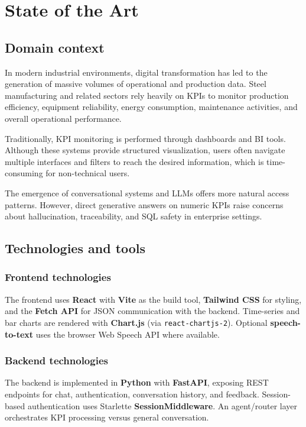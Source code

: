 \chapter{State of the Art}

\section{Domain context}
In modern industrial environments, digital transformation has led to the generation of massive volumes of operational and production data. Steel manufacturing and related sectors rely heavily on KPIs to monitor production efficiency, equipment reliability, energy consumption, maintenance activities, and overall operational performance.

Traditionally, KPI monitoring is performed through dashboards and BI tools. Although these systems provide structured visualization, users often navigate multiple interfaces and filters to reach the desired information, which is time-consuming for non-technical users.

The emergence of conversational systems and LLMs offers more natural access patterns. However, direct generative answers on numeric KPIs raise concerns about hallucination, traceability, and SQL safety in enterprise settings.

\section{Technologies and tools}
\subsection{Frontend technologies}
The frontend uses \textbf{React} with \textbf{Vite} as the build tool, \textbf{Tailwind CSS} for styling, and the \textbf{Fetch API} for JSON communication with the backend. Time-series and bar charts are rendered with \textbf{Chart.js} (via \texttt{react-chartjs-2}). Optional \textbf{speech-to-text} uses the browser Web Speech API where available.

\subsection{Backend technologies}
The backend is implemented in \textbf{Python} with \textbf{FastAPI}, exposing REST endpoints for chat, authentication, conversation history, and feedback. Session-based authentication uses Starlette \textbf{SessionMiddleware}. An agent/router layer orchestrates KPI processing versus general conversation.

